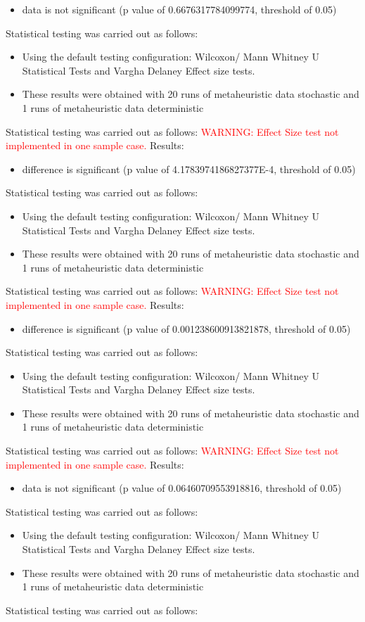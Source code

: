 \documentclass[]{article}
\begin{document}
\begin{itemize}
\item{data is not significant (p value of 0.6676317784099774, threshold of 0.05)}
\end{itemize}Statistical testing was carried out as follows: \begin{itemize}
\item{Using the default testing configuration: Wilcoxon/ Mann Whitney U Statistical Tests and Vargha Delaney Effect size tests.}
\item{These results were obtained with 20 runs of metaheuristic data stochastic and 1 runs of metaheuristic data deterministic}
\end{itemize}Statistical testing was carried out as follows: 
\textcolor{Red}{WARNING: Effect Size test not implemented in one sample case.
}
Results:
\begin{itemize}
\item{difference is significant (p value of 4.1783974186827377E-4, threshold of 0.05)}
\end{itemize}Statistical testing was carried out as follows: \begin{itemize}
\item{Using the default testing configuration: Wilcoxon/ Mann Whitney U Statistical Tests and Vargha Delaney Effect size tests.}
\item{These results were obtained with 20 runs of metaheuristic data stochastic and 1 runs of metaheuristic data deterministic}
\end{itemize}Statistical testing was carried out as follows: 
\textcolor{Red}{WARNING: Effect Size test not implemented in one sample case.
}
Results:
\begin{itemize}
\item{difference is significant (p value of 0.001238600913821878, threshold of 0.05)}
\end{itemize}Statistical testing was carried out as follows: \begin{itemize}
\item{Using the default testing configuration: Wilcoxon/ Mann Whitney U Statistical Tests and Vargha Delaney Effect size tests.}
\item{These results were obtained with 20 runs of metaheuristic data stochastic and 1 runs of metaheuristic data deterministic}
\end{itemize}Statistical testing was carried out as follows: 
\textcolor{Red}{WARNING: Effect Size test not implemented in one sample case.
}
Results:
\begin{itemize}
\item{data is not significant (p value of 0.06460709553918816, threshold of 0.05)}
\end{itemize}Statistical testing was carried out as follows: \begin{itemize}
\item{Using the default testing configuration: Wilcoxon/ Mann Whitney U Statistical Tests and Vargha Delaney Effect size tests.}
\item{These results were obtained with 20 runs of metaheuristic data stochastic and 1 runs of metaheuristic data deterministic}
\end{itemize}Statistical testing was carried out as follows: 
\end{document}

